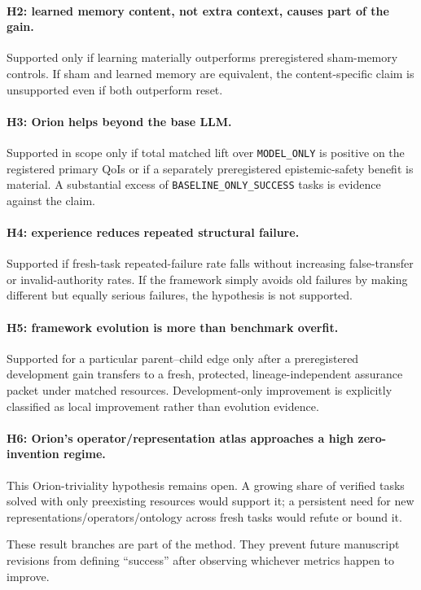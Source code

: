 \paragraph{H2: learned memory content, not extra context, causes part of the gain.}
Supported only if learning materially outperforms preregistered sham-memory controls. If sham and learned memory are equivalent, the content-specific claim is unsupported even if both outperform reset.

\paragraph{H3: Orion helps beyond the base LLM.}
Supported in scope only if total matched lift over \texttt{MODEL\_ONLY} is positive on the registered primary QoIs or if a separately preregistered epistemic-safety benefit is material. A substantial excess of \texttt{BASELINE\_ONLY\_SUCCESS} tasks is evidence against the claim.

\paragraph{H4: experience reduces repeated structural failure.}
Supported if fresh-task repeated-failure rate falls without increasing false-transfer or invalid-authority rates. If the framework simply avoids old failures by making different but equally serious failures, the hypothesis is not supported.

\paragraph{H5: framework evolution is more than benchmark overfit.}
Supported for a particular parent--child edge only after a preregistered development gain transfers to a fresh, protected, lineage-independent assurance packet under matched resources. Development-only improvement is explicitly classified as local improvement rather than evolution evidence.

\paragraph{H6: Orion's operator/representation atlas approaches a high zero-invention regime.}
This Orion-triviality hypothesis remains open. A growing share of verified tasks solved with only preexisting resources would support it; a persistent need for new representations/operators/ontology across fresh tasks would refute or bound it.

These result branches are part of the method. They prevent future manuscript revisions from defining ``success'' after observing whichever metrics happen to improve.